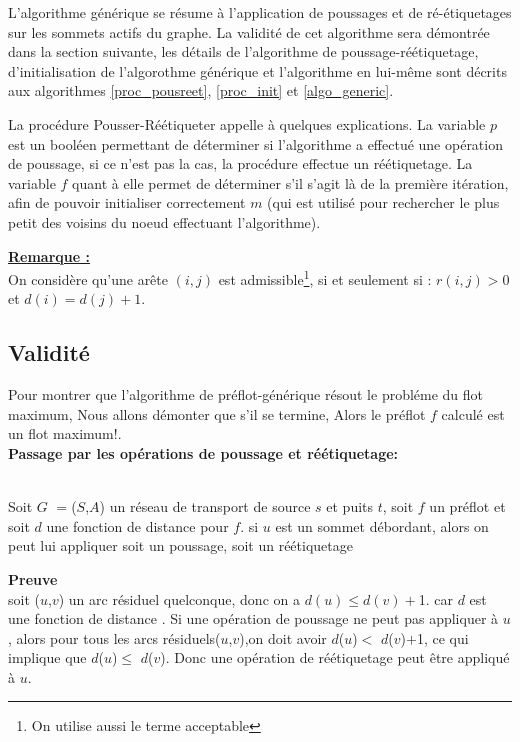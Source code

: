 L'algorithme générique se résume à l'application de poussages et de ré-étiquetages sur les sommets
actifs du graphe. La validité de cet algorithme sera démontrée dans la section suivante, les détails
de l'algorithme de poussage-réétiquetage, d'initialisation de l'algorothme générique et l'algorithme
en lui-même sont décrits aux algorithmes \ref{proc_pousreet}, \ref{proc_init} et
\ref{algo_generic}.

La procédure Pousser-Réétiqueter appelle à quelques explications. La variable $p$ est un booléen
permettant de déterminer si l'algorithme a effectué une opération de poussage, si ce n'est pas la
cas, la procédure effectue un réétiquetage. La variable $f$ quant à elle permet de déterminer s'il
s'agit là de la première itération, afin de pouvoir initialiser correctement $m$ (qui est utilisé
pour rechercher le plus petit des voisins du noeud effectuant l'algorithme).

\textbf{\underline{Remarque :}} \\
On considère qu'une arête $(i,j)$ est admissible\footnote{On utilise aussi le terme acceptable}, si 
et seulement si : $r(i,j) > 0$ et $d(i) = d(j) + 1$.

\subsection{Validité}

Pour montrer que l'algorithme de préflot-générique résout le probléme du flot maximum, Nous allons démonter que s'il se termine, Alors le préflot $f$ calculé est un flot maximum!.\\

\textbf{Passage par les opérations de poussage et réétiquetage:}  
\begin{lemma} ~\\
	\label{increase_distance}Soit $G$ $=$($S$,$A$) un réseau de transport de source $s$ et puits $t$, soit $f$ un préflot et 
  soit $d$ une fonction  de distance  pour $f$. si $u$ est un sommet débordant, alors on peut lui appliquer soit un poussage, soit un réétiquetage  
\end{lemma}   
\textbf{Preuve} \\
soit ($u$,$v$) un arc résiduel quelconque, donc on a $d(u)\leq d(v)+$1. car $d$ est une fonction  de distance .  Si une opération de poussage ne peut pas appliquer à $u$, alors pour tous les arcs résiduels($u$,$v$),on doit avoir $d$($u$)$<$ $d$($v$)$+$1, ce qui implique que $d$($u$)$\leq$ $d$($v$). Donc une opération de réétiquetage peut être appliqué à $u$.\\                        

